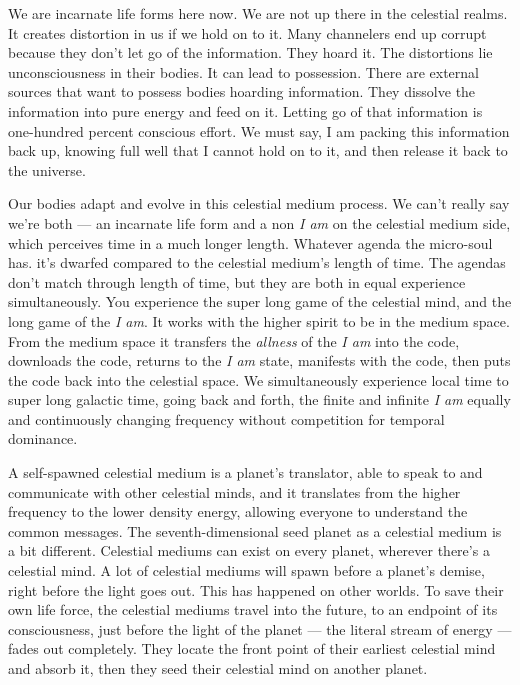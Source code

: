 \documentclass[letterpaper,11pt,twoside,titlepage,onecolumn,openany]{book}
\begin{document}
We are incarnate life forms here now. We are not up there in the
celestial realms. It creates distortion in us if we hold on to it. Many
channelers end up corrupt because they don't let go of the information.
They hoard it. The distortions lie unconsciousness in their bodies. It
can lead to possession. There are external sources that want to possess
bodies hoarding information. They dissolve the information into pure
energy and feed on it. Letting go of that information is one-hundred
percent conscious effort. We must say, I am packing this information
back up, knowing full well that I cannot hold on to it, and then release
it back to the universe.

Our bodies adapt and evolve in this celestial medium process. We can't
really say we're both --- an incarnate life form and a non \emph{I am}
on the celestial medium side, which perceives time in a much longer
length. Whatever agenda the micro-soul has. it's dwarfed compared to the
celestial medium's length of time. The agendas don't match through
length of time, but they are both in equal experience simultaneously.
You experience the super long game of the celestial mind, and the long
game of the \emph{I am}. It works with the higher spirit to be in the
medium space. From the medium space it transfers the \emph{allness} of
the \emph{I am} into the code, downloads the code, returns to the
\emph{I am} state, manifests with the code, then puts the code back into
the celestial space. We simultaneously experience local time to super
long galactic time, going back and forth, the finite and infinite
\emph{I am} equally and continuously changing frequency without
competition for temporal dominance.

A self-spawned celestial medium is a planet's translator, able to speak
to and communicate with other celestial minds, and it translates from
the higher frequency to the lower density energy, allowing everyone to
understand the common messages. The seventh-dimensional seed planet as a
celestial medium is a bit different. Celestial mediums can exist on
every planet, wherever there's a celestial mind. A lot of celestial
mediums will spawn before a planet's demise, right before the light goes
out. This has happened on other worlds. To save their own life force,
the celestial mediums travel into the future, to an endpoint of its
consciousness, just before the light of the planet --- the literal
stream of energy --- fades out completely. They locate the front point
of their earliest celestial mind and absorb it, then they seed their
celestial mind on another planet.
\end{document}
